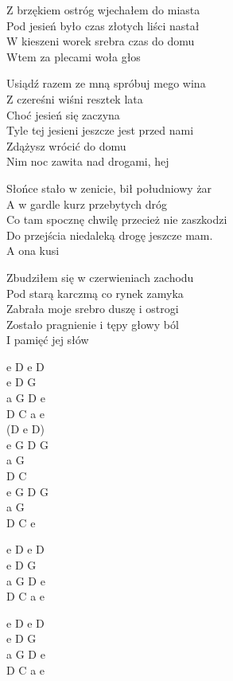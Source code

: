 \begin{text}
    Z brzękiem ostróg wjechałem do miasta\\
    Pod jesień było czas złotych liści nastał\\
    W kieszeni worek srebra czas do domu\\
    Wtem za plecami woła głos

    \vin Usiądź razem ze mną spróbuj mego wina\\
    \vin Z czereśni wiśni resztek lata\\
    \vin Choć jesień się zaczyna\\
    \vin Tyle tej jesieni jeszcze jest przed nami\\
    \vin Zdążysz wrócić do domu\\
    \vin Nim noc zawita nad drogami, hej

    Słońce stało w zenicie, bił południowy żar\\
    A w gardle kurz przebytych dróg\\
    Co tam spocznę chwilę przecież nie zaszkodzi\\
    Do przejścia niedaleką drogę jeszcze mam.\\
    A ona kusi

    Zbudziłem się w czerwieniach zachodu\\
    Pod starą karczmą co rynek zamyka\\
    Zabrała moje srebro duszę i ostrogi\\
    Zostało pragnienie i tępy głowy ból\\
    I pamięć jej słów
\end{text}
\begin{chord}
    e D e D\\
    e D G\\
    a G D e\\
    D C a e\\
    (D e D)\\
    e G D G\\
    a G\\
    D C\\
    e G D G\\
    a G\\
    D C e

    e D e D\\
    e D G\\
    a G D e\\
    D C a e

    \hfill\break
    e D e D\\
    e D G\\
    a G D e\\
    D C a e
\end{chord}